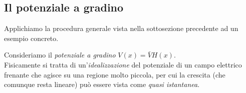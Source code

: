 \documentclass[../../FisicaTeorica.tex]{subfiles}
\begin{document}
\begin{comment}
\textbf{Commento sulle puntate precedenti}\\
Quando avevamo detto:
\[
\cos\left(\frac{2\pi n x}{a}\right)\xrightarrow[\mathcal{S}']{n\to\infty}0
\]
Significa precisamente:
\[
\int dx \cos\left(\frac{2\pi n x}{a}\right) \varphi(x)\xrightarrow[n\to\infty]{}0\quad \forall \varphi \in \mathcal{S}(\bb{R})
\]
(L'idea è che per $n$ molto grande, la fluttuazione è molto frequente, e quindi \textit{in media} la funzione è nulla).\\
Ciò è vero per il \textbf{teorema di\ Riemann-Lebesgue}, per cui una $f\in L'(\bb{R})$ si ha che:
\[
\int dx f(x) e^{ikx}\xrightarrow[n\to\infty]{} 0
\]
(e quindi in particolare è vero per le funzioni nello spazio di Schwartz, dato che $\mathcal{S}(\bb{R})\subset L'(\bb{R})$)
\end{comment}
\subsection{Il potenziale a gradino}
Applichiamo la procedura generale vista nella sottosezione precedente ad un esempio concreto.\\
\begin{center}

\end{center}
Consideriamo il \textit{potenziale a gradino} $V(x)=\bar{V}H(x)$.\\
Fisicamente si tratta di un'\textit{idealizzazione} del potenziale di un campo elettrico frenante che agisce su una regione molto piccola, per cui la crescita (che comunque resta lineare) può essere vista come \textit{quasi istantanea}.\\
\end{document}
